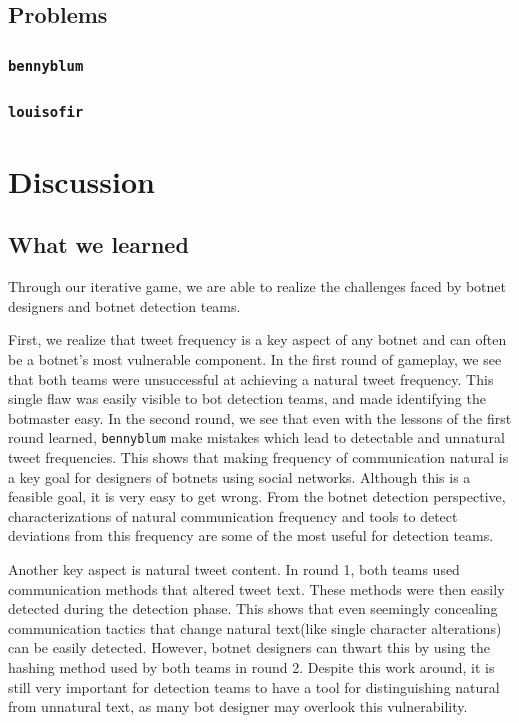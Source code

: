 \documentclass[11pt, oneside]{article} %
\numberwithin{equation}{section} %
\numberwithin{figure}{section} %
\numberwithin{table}{section} %
\renewcommand{\c}[1]{\texttt{#1}}
\newcommand{\teambb}{\c{bennyblum}}
\newcommand{\teamol}{\c{louisofir}}
\begin{document}
	\subsection{Problems}
		\subsubsection{\teambb{}}

		\subsubsection{\teamol{}}

\section{Discussion}

	\subsection{What we learned}
		Through our iterative game, we are able to realize the challenges faced by botnet designers and botnet detection teams. 

		First, we realize that tweet frequency is a key aspect of any botnet and can often be a botnet's most vulnerable component. In the first round of gameplay, we see that both teams were unsuccessful at achieving a natural tweet frequency. This single flaw was easily visible to bot detection teams, and made identifying the botmaster easy. In the second round, we see that even with the lessons of the first round learned, \teambb{} make mistakes which lead to detectable and unnatural tweet frequencies. This shows that making frequency of communication natural is a key goal for designers of botnets using social networks. Although this is a feasible goal, it is very easy to get wrong. From the botnet detection perspective, characterizations of natural communication frequency and tools to detect deviations from this frequency are some of the most useful for detection teams. 

		Another key aspect is natural tweet content. In round 1, both teams used communication methods that altered tweet text. These methods were then easily detected during the detection phase. This shows that even seemingly concealing communication tactics that change natural text(like single character alterations) can be easily detected. However, botnet designers can thwart this by using the hashing method used by both teams in round 2. Despite this work around, it is still very important for detection teams to have a tool for distinguishing natural from unnatural text, as many bot designer may overlook this vulnerability.
\end{document}
